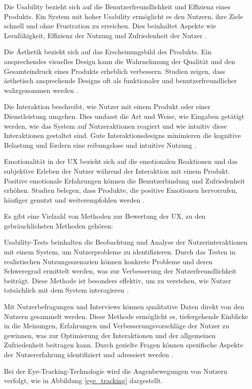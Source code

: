 Die Usability bezieht sich auf die Benutzerfreundlichkeit und Effizienz eines Produkts. 
Ein System mit hoher Usability ermöglicht es den Nutzern, ihre Ziele schnell und ohne Frustration zu erreichen. 
Dies beinhaltet Aspekte wie Lernfähigkeit, Effizienz der Nutzung und Zufriedenheit der Nutzer \cite[S.23 ff.]{Nielsen}.

Die Ästhetik bezieht sich auf das Erscheinungsbild des Produkts. 
Ein ansprechendes visuelles Design kann die Wahrnehmung der Qualität und den Gesamteindruck eines Produkts erheblich verbessern. 
Studien zeigen, dass ästhetisch ansprechende Designs oft als funktionaler und benutzerfreundlicher wahrgenommen werden \cite{Tractinsky}.

Die Interaktion beschreibt, wie Nutzer mit einem Produkt oder einer Dienstleistung umgehen. 
Dies umfasst die Art und Weise, wie Eingaben getätigt werden, wie das System auf Nutzeraktionen reagiert und wie intuitiv diese Interaktionen gestaltet sind. 
Gute Interaktionsdesigns minimieren die kognitive Belastung und fördern eine reibungslose und intuitive Nutzung \cite{interaction_design}.

Emotionalität in der UX bezieht sich auf die emotionalen Reaktionen und das subjektive Erleben der Nutzer während der Interaktion mit einem Produkt. 
Positive emotionale Erfahrungen können die Benutzerbindung und Zufriedenheit erhöhen. 
Studien belegen, dass Produkte, die positive Emotionen hervorrufen, häufiger genutzt und weiterempfohlen werden \cite{emotion}.

Es gibt eine Vielzahl von Methoden zur Bewertung der UX, zu den gebräuchlichsten Methoden gehören:

Usability-Tests beinhalten die Beobachtung und Analyse der Nutzerinteraktionen mit einem System, um Nutzerprobleme zu identifizieren. 
Durch das Testen in realistischen Nutzungsszenarien können konkrete Probleme und deren Schweregrad ermittelt werden, was zur Verbesserung der Nutzerfreundlichkeit beiträgt. 
Diese Methode ist besonders effektiv, um zu verstehen, wie Nutzer tatsächlich mit dem System interagieren \cite[S.165 ff.]{Nielsen}.

Mit Nutzerbefragungen und Interviews können qualitative Daten direkt von den Nutzern gesammelt werden. 
Diese Methode ermöglicht es, tiefergehende Einblicke in die Meinungen, Erfahrungen und Verbesserungsvorschläge der Nutzer zu gewinnen, was zur Optimierung der Interaktionen und der allgemeinen Zufriedenheit beitragen kann. 
Durch gezielte Fragen können spezifische Aspekte der Nutzererfahrung identifiziert und adressiert werden \cite{ux_bewertung_interview}.

Bei der Eye-Tracking-Technologie wird die Augenbewegungen von Nutzern verfolgt, wie in Abbildung \ref{eye_tracking} dargestellt. 
